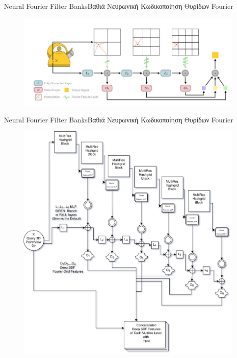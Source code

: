 \documentclass[10pt]{beamer}
\begin{document}
\begin{frame}{Neural Fourier Filter Banks}{Βαθιά Νευρωνική Κωδικοποίηση Θυρίδων Fourier}
\begin{figure}
    \centering
    \includegraphics[width=\textwidth]{images/nffb_og_architecture.jpg}
\end{figure}
\end{frame}
\begin{frame}{Neural Fourier Filter Banks}{Βαθιά Νευρωνική Κωδικοποίηση Θυρίδων Fourier}
    \begin{figure}
        \centering
        \includegraphics[width=.9\textwidth,height=.7\textheight,keepaspectratio]{images/Neural Fourier Filter Banks.jpg}
    \end{figure}
\end{frame}
\end{document}
